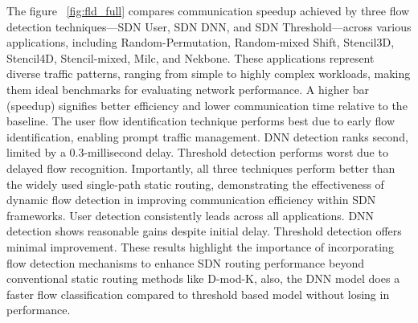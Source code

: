 The figure ~\ref{fig:fld_full} compares communication speedup achieved by three flow detection techniques—SDN User, SDN DNN, and SDN Threshold—across various applications, including Random-Permutation, Random-mixed Shift, Stencil3D, Stencil4D, Stencil-mixed, Milc, and Nekbone. These applications represent diverse traffic patterns, ranging from simple to highly complex workloads, making them ideal benchmarks for evaluating network performance.  A higher bar (speedup) signifies better efficiency and lower communication time relative to the baseline. The user flow identification technique performs best due to early flow identification, enabling prompt traffic management. DNN detection ranks second, limited by a 0.3-millisecond delay. Threshold detection performs worst due to delayed flow recognition. Importantly, all three techniques perform better than the widely used single-path static routing, demonstrating the effectiveness of dynamic flow detection in improving communication efficiency within SDN frameworks. User detection consistently leads across all applications. DNN detection shows reasonable gains despite initial delay. Threshold detection offers minimal improvement. These results highlight the importance of incorporating flow detection mechanisms to enhance SDN routing performance beyond conventional static routing methods like D-mod-K, also, the DNN model does a faster flow classification compared to threshold based model without losing in performance.


